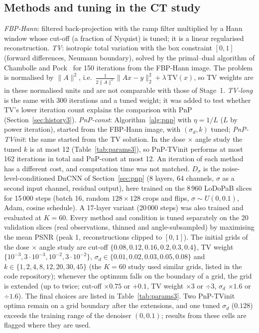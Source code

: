 \subsection{Methods and tuning in the CT study}\label{sec:methods3}
\emph{FBP-Hann}: filtered back-projection with the ramp filter multiplied by a Hann window whose cut-off (a fraction of Nyquist) is tuned; it is a linear regularised reconstruction. \emph{TV}: isotropic total variation with the box constraint $[0,1]$ (forward differences, Neumann boundary), solved by the primal--dual algorithm of Chambolle and Pock~\citep{chambolle2011} for 150 iterations
from the FBP-Hann image. The problem is normalised by $\lVert A\rVert^2$, i.e.\ $\tfrac{1}{2\lVert A\rVert^2}\lVert Ax-y\rVert_2^2+\lambda\,\mathrm{TV}(x)$, so TV weights are in these normalised units and are not comparable with those of Stage~1.
\emph{TV-long} is the same with 300 iterations and a tuned weight; it was added to test whether TV's lower iteration count explains the comparison with PnP (Section~\ref{sec:history3}).
\emph{PnP-const}: Algorithm~\ref{alg:pnp} with $\eta=1/L$ ($L$ by power iteration), started from the FBP-Hann image, with
$(\sigma_d,k)$ tuned; \emph{PnP-TVinit}: the same started from the TV solution. In the dose $\times$ angle study the tuned $k$ is at most 12 (Table~\ref{tab:params3}), so PnP-TVinit performs at most 162 iterations in total and PnP-const at most 12.
An iteration of each method has a different cost, and computation time was not matched.
$D_\sigma$ is the noise-level-conditioned DnCNN of Section~\ref{sec:pnp} (8 layers, 64 channels, $\sigma$ as a second input channel, residual output), here trained on the 8\,960 LoDoPaB slices for 15\,000 steps (batch 16, random $128\times128$ crops and flips, $\sigma\sim U(0,0.1)$, Adam, cosine schedule).
A 17-layer variant (20\,000 steps) was also trained and evaluated at $K=60$.
Every method and condition is tuned separately on the 20 validation slices (real observations, thinned and angle-subsampled) by maximising the mean PSNR (peak 1, reconstructions clipped to $[0,1]$).
The initial grids of the dose $\times$ angle study are cut-off $\{0.08,0.12,0.16,0.2,0.3,0.4\}$, TV weight $\{10^{-3},3\cdot10^{-3},10^{-2},3\cdot10^{-2}\}$, $\sigma_d\in\{0.01,0.02,0.03,0.05,0.08\}$ and $k\in\{1,2,4,8,12,20,30,45\}$ (the $K=60$ study used similar grids, listed in the code repository); whenever the optimum falls on the boundary of a grid, the grid is extended (up to twice; cut-off $\times0.75$ or $+0.1$, TV weight $\times3$ or $\div3$,
$\sigma_d$ $\times1.6$ or $\div1.6$). The final choices are listed in Table~\ref{tab:params3}. Two PnP-TVinit optima remain on a grid boundary after the extensions, and one tuned $\sigma_d$ ($0.128$) exceeds the training range of the denoiser $(0,0.1)$; results from these cells are flagged where they are used.

